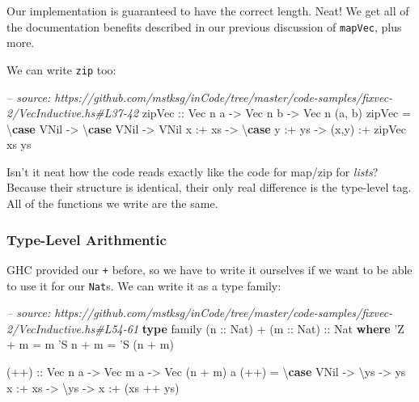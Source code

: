 \documentclass[]{article}
\newenvironment{Shaded}{}{}
\newcommand{\KeywordTok}[1]{\textcolor[rgb]{0.00,0.44,0.13}{\textbf{#1}}}
\newcommand{\DataTypeTok}[1]{\textcolor[rgb]{0.56,0.13,0.00}{#1}}
\newcommand{\CharTok}[1]{\textcolor[rgb]{0.25,0.44,0.63}{#1}}
\newcommand{\CommentTok}[1]{\textcolor[rgb]{0.38,0.63,0.69}{\textit{#1}}}
\newcommand{\OtherTok}[1]{\textcolor[rgb]{0.00,0.44,0.13}{#1}}
\newcommand{\FunctionTok}[1]{\textcolor[rgb]{0.02,0.16,0.49}{#1}}
\newcommand{\NormalTok}[1]{#1}
\begin{document}
Our implementation is guaranteed to have the correct length. Neat! We get all of
the documentation benefits described in our previous discussion of
\texttt{mapVec}, plus more.

We can write \texttt{zip} too:

\begin{Shaded}
\begin{Highlighting}[]
\CommentTok{-- source: https://github.com/mstksg/inCode/tree/master/code-samples/fixvec-2/VecInductive.hs#L37-42}
\OtherTok{zipVec ::} \DataTypeTok{Vec}\NormalTok{ n a }\OtherTok{->} \DataTypeTok{Vec}\NormalTok{ n b }\OtherTok{->} \DataTypeTok{Vec}\NormalTok{ n (a, b)}
\NormalTok{zipVec }\FunctionTok{=}\NormalTok{ \textbackslash{}}\KeywordTok{case}
    \DataTypeTok{VNil} \OtherTok{->}\NormalTok{ \textbackslash{}}\KeywordTok{case}
      \DataTypeTok{VNil} \OtherTok{->} \DataTypeTok{VNil}
\NormalTok{    x }\FunctionTok{:+}\NormalTok{ xs }\OtherTok{->}\NormalTok{ \textbackslash{}}\KeywordTok{case}
\NormalTok{      y }\FunctionTok{:+}\NormalTok{ ys }\OtherTok{->}\NormalTok{ (x,y) }\FunctionTok{:+}\NormalTok{ zipVec xs ys}
\end{Highlighting}
\end{Shaded}

Isn't it neat how the code reads exactly like the code for map/zip for
\emph{lists}? Because their structure is identical, their only real difference
is the type-level tag. All of the functions we write are the same.

\subsubsection{Type-Level Arithmentic}\label{type-level-arithmentic}

GHC provided our \texttt{+} before, so we have to write it ourselves if we want
to be able to use it for our \texttt{Nat}s. We can write it as a type family:

\begin{Shaded}
\begin{Highlighting}[]
\CommentTok{-- source: https://github.com/mstksg/inCode/tree/master/code-samples/fixvec-2/VecInductive.hs#L54-61}
\KeywordTok{type}\NormalTok{ family (}\OtherTok{n ::} \DataTypeTok{Nat}\NormalTok{) }\FunctionTok{+}\NormalTok{ (}\OtherTok{m ::} \DataTypeTok{Nat}\NormalTok{)}\OtherTok{ ::} \DataTypeTok{Nat} \KeywordTok{where}
    \CharTok{'Z   + m = m}
    \CharTok{'S n + m = '}\DataTypeTok{S}\NormalTok{ (n }\FunctionTok{+}\NormalTok{ m)}


\OtherTok{(++) ::} \DataTypeTok{Vec}\NormalTok{ n a }\OtherTok{->} \DataTypeTok{Vec}\NormalTok{ m a }\OtherTok{->} \DataTypeTok{Vec}\NormalTok{ (n }\FunctionTok{+}\NormalTok{ m) a}
\NormalTok{(}\FunctionTok{++}\NormalTok{) }\FunctionTok{=}\NormalTok{ \textbackslash{}}\KeywordTok{case}
    \DataTypeTok{VNil}    \OtherTok{->}\NormalTok{ \textbackslash{}ys }\OtherTok{->}\NormalTok{ ys}
\NormalTok{    x }\FunctionTok{:+}\NormalTok{ xs }\OtherTok{->}\NormalTok{ \textbackslash{}ys }\OtherTok{->}\NormalTok{ x }\FunctionTok{:+}\NormalTok{ (xs }\FunctionTok{++}\NormalTok{ ys)}
\end{Highlighting}
\end{Shaded}
\end{document}
